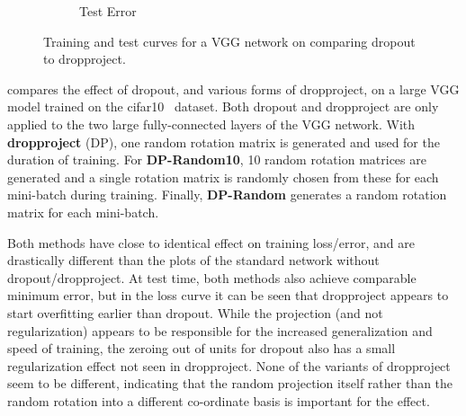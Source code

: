 \documentclass[thesis]{subfiles}
\begin{document}
\begin{figure}[tbp]
\begin{subfigure}[b]{\linewidth}
\caption{ Test Error}
\label{fig:cifar_dropproject_test_acc}
\end{subfigure}
\caption[Dropout \vs dropproject for VGG/]{Training and test curves for a VGG network on  comparing dropout to dropproject.}
\label{fig:cifar_dropproject}
\end{figure}

 compares the effect of dropout, and various forms of dropproject, on a large VGG model trained on the \gls{cifar10}~\citep{CIFAR10} dataset. Both dropout and dropproject are only applied to the two large fully-connected layers of the VGG network. With \textbf{dropproject} (DP), one random rotation matrix is generated and used for the duration of training. For \textbf{DP-Random10}, 10 random rotation matrices are generated and a single rotation matrix is randomly chosen from these for each mini-batch during training. Finally, \textbf{DP-Random} generates a random rotation matrix for each mini-batch.

Both methods have close to identical effect on training loss/error, and are drastically different than the plots of the standard network without dropout/dropproject. At test time, both methods also achieve comparable minimum error, but in the loss curve it can be seen that dropproject appears to start overfitting earlier than dropout. While the projection (and not regularization) appears to be responsible for the increased generalization and speed of training, the zeroing out of units for dropout also has a small regularization effect not seen in dropproject. None of the variants of dropproject seem to be different, indicating that the random projection itself rather than the random rotation into a different co-ordinate basis is important for the effect.
\end{document}
